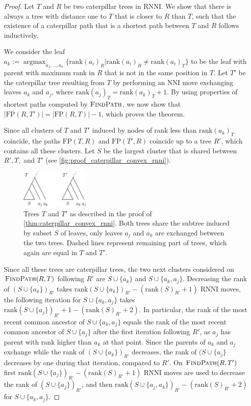 \documentclass[11pt]{amsart}
\newcommand{\rnni}{\mathrm{RNNI}}
\newcommand{\findpath}{\textsc{FindPath}}
\newcommand{\rank}{\mathrm{rank}}
\newcommand{\nni}{\mathrm{NNI}}
\newcommand{\fp}{\mathrm{FP}}
\DeclareMathOperator*{\argmax}{argmax}
\begin{document}
\begin{proof}
	Let $T$ and $R$ be two caterpillar trees in $\rnni$.
	We show that there is always a tree with distance one to $T$ that is closer to $R$ than $T$, such that the existence of a caterpillar path that is a shortest path between $T$ and $R$ follows inductively.

	We consider the leaf $a_k := \argmax_{a_1, \ldots, a_n}\{\rank(a_i)_R | \rank(a_i)_R \neq \rank(a_i)_T\}$ to be the leaf with parent with maximum rank in $R$ that is not in the same position in $T$.
	Let $T'$ be the caterpillar tree resulting from $T$ by performing an $\nni$ move exchanging leaves $a_k$ and $a_j$, where $\rank(a_j)_T = \rank(a_k)_T + 1$.
	By using properties of shortest paths computed by $\findpath$, we now show that $|\fp(R,T')| = |\fp(R,T)| - 1$, which proves the theorem.

	Since all clusters of $T$ and $T'$ induced by nodes of rank less than $\rank(a_k)_T$ coincide, the paths $\fp(T,R)$ and $\fp(T',R)$ coincide up to a tree $R'$, which contains all these clusters.
	Let $S$ be the largest cluster that is shared between $R', T,$ and $T'$ (see \autoref{fig:proof_caterpillar_convex_rnni}).

	\begin{figure}[ht]
		\includegraphics[width=0.3\textwidth]{proof_caterpillar_convex_rnni.eps}
		\caption{Trees $T$ and $T'$ as described in the proof of \autoref{thm:caterpillar_convex_rnni}.
		Both trees share the subtree induced by subset $S$ of leaves, only leaves $a_j$ and $a_k$ are exchanged between the two trees.
		Dashed lines represent remaining part of trees, which again are equal in $T$ and $T'$.}
		\label{fig:proof_caterpillar_convex_rnni}
	\end{figure}

	Since all these trees are caterpillar trees, the two next clusters considered on $\findpath(R,T)$ following $R'$ are $S \cup \{a_k\}$ and $S \cup \{a_k, a_j\}$.
	Decreasing the rank of $(S \cup \{a_k\})_{R'}$ takes $\rank(S \cup \{a_k\})_{R'} - (\rank(S)_{R'} + 1)$ $\rnni$ moves, the following iteration for $S \cup \{a_k, a_j\}$ takes $\rank(S \cup \{a_j\})_{R'} + 1 - (\rank(S)_{R'} + 2)$.
	In particular, the rank of the most recent common ancestor of $S \cup \{a_k, a_j\}$ equals the rank of the most recent common ancestor of $S \cup \{a_j\}$ after the first iteration following $R'$, as $a_j$ has parent with rank higher than $a_k$ at that point.
	Since the parents of $a_k$ and $a_j$ exchange while the rank of $(S \cup \{a_k\})_{R'}$ decreases, the rank of $(S \cup \{a_j\}$ decreases by one during that iteration, compared to $R'$.
	On $\findpath(R,T')$ first $\rank(S \cup \{a_j\})_{R'} - (\rank(S)_{R'} + 1)$ $\rnni$ moves are used to decrease the rank of $(S \cup \{a_j\})_{R'}$, and then $\rank(S \cup \{a_j, a_k\})_{R'} - (\rank(S)_{R'} + 2)$ for $S \cup \{a_k, a_j\}$.


\end{proof}
\end{document}

